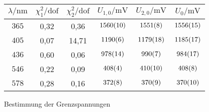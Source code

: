 \begin{figure}[htbp]
   \centering
\caption{Bestimmung der Grenzspannungen}
\begin{tabular}{c c c c c c}
\hline$\lambda / \unit{\nano\meter}$ & $\chi_1^2/\mathrm{dof}$ & $\chi_2^2/\mathrm{dof}$ & $U_{1,0}/\unit{\milli\volt}$ & $U_{2,0}/\unit{\milli\volt}$ & $U_0/\unit{\milli\volt}$ \\ 
\hline
$\num{365}$ & 0,32 & 0,36 & $\num{1560\pm 10}$ & $\num{1551\pm 8}$ & $\num{1556\pm 15}$ \\
$\num{405}$ & 0,07 & 14,71 & $\num{1190\pm 6}$ & $\num{1179\pm 18}$ & $\num{1185\pm 17}$ \\
$\num{436}$ & 0,60 & 0,06 & $\num{978\pm 14}$ & $\num{990\pm 7}$ & $\num{984\pm 17}$ \\
$\num{546}$ & 0,22 & 0,09 & $\num{408\pm 4}$ & $\num{410\pm 10}$ & $\num{408\pm 8}$ \\
$\num{578}$ & 0,28 & 0,16 & $\num{372\pm 8}$ & $\num{370\pm 9}$ & $\num{370\pm 10}$ \\
\hline\end{tabular}
\label{fig:messwerte_grenzspannungen}
\end{figure}